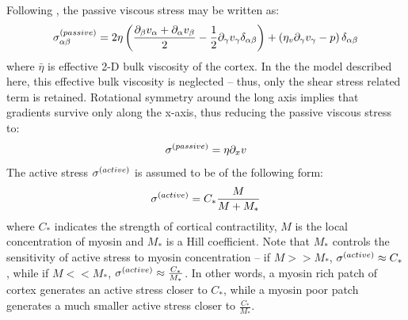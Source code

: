 Following \cite{julicher2018hydrodynamic}, the passive viscous stress may be written as:
\begin{equation}
    \speciesSuper{\sigma}{passive}_{\alpha\beta} = 2\eta \left(\frac{\inlinePartial{\beta}{v_\alpha} + \inlinePartial{\alpha}{v_\beta}}{2} - \frac{1}{2}\inlinePartial{\gamma}{v_\gamma}\delta_{\alpha\beta}\right) + \left(\eta_v\inlinePartial{\gamma}{v_\gamma} - p\right)\delta_{\alpha\beta}
\end{equation}
where $\bar{\eta}$ is effective 2-D bulk viscosity of the cortex. In the the model described here, this effective bulk viscosity is neglected -- thus, only the shear stress related term is retained. Rotational symmetry around the long axis implies that gradients survive only along the x-axis, thus reducing the passive viscous stress to:
\begin{equation}\label{eq:passiveStressModelPG}
    \speciesSuper{\sigma}{passive} = \eta \inlinePartial{x}{v}
\end{equation}
The active stress $\sigma^{(active)}$ is assumed to be of the following form:
\begin{equation}\label{eq:activeStressModelPG}
    \sigma^{(active)} = C_*\frac{M}{M + M_*}
\end{equation}
where $C_*$ indicates the strength of cortical contractility, $M$ is the local concentration of myosin and $M_*$ is a Hill coefficient. Note that $M_*$ controls the sensitivity of active stress to myosin concentration -- if $M >> M_*$, $\sigma^{(active)} \approx C_*$, while if $M << M_*$, $\sigma^{(active)} \approx \frac{C_*}{M_*}$. In other words, a myosin rich patch of cortex generates an active stress closer to $C_*$, while a myosin poor patch generates a much smaller active stress closer to $\frac{C_*}{M_*}$.

